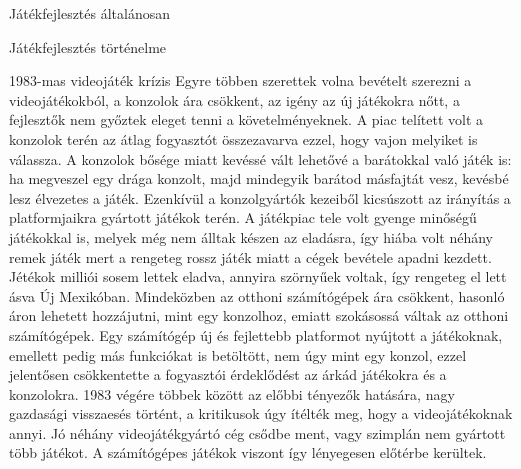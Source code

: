 \begin{MyChapter}{Játékfejlesztés általánosan}
\begin{MySection}{Játékfejlesztés történelme}
		\begin{MySubSection}{1983-mas videojáték krízis}
			Egyre többen szerettek volna bevételt szerezni a videojátékokból, a konzolok ára csökkent, az igény az új játékokra nőtt, a fejlesztők nem győztek eleget tenni a követelményeknek. A piac telített volt a konzolok terén az átlag fogyasztót összezavarva ezzel, hogy vajon melyiket is válassza. A konzolok bősége miatt kevéssé vált lehetővé a barátokkal való játék is: ha megveszel egy drága konzolt, majd mindegyik barátod másfajtát vesz, kevésbé lesz élvezetes a játék. Ezenkívül a konzolgyártók kezeiből kicsúszott az irányítás a platformjaikra gyártott játékok terén. A játékpiac tele volt gyenge minőségű játékokkal is, melyek még nem álltak készen az eladásra, így hiába volt néhány remek játék mert a rengeteg rossz játék miatt a cégek bevétele apadni kezdett. Jétékok milliói sosem lettek eladva, annyira szörnyűek voltak, így rengeteg el lett ásva Új Mexikóban. Mindeközben az otthoni számítógépek ára csökkent, hasonló áron lehetett hozzájutni, mint egy konzolhoz, emiatt szokásossá váltak az otthoni számítógépek. Egy számítógép új és fejlettebb platformot nyújtott a játékoknak, emellett pedig más funkciókat is betöltött, nem úgy mint egy konzol, ezzel jelentősen csökkentette a fogyasztói érdeklődést az árkád játékokra és a konzolokra. 1983 végére többek között az előbbi tényezők hatására, nagy gazdasági visszaesés történt, a kritikusok úgy ítélték meg, hogy a videojátékoknak annyi. Jó néhány videojátékgyártó cég csődbe ment, vagy szimplán nem gyártott több játékot.
			A számítógépes játékok viszont így lényegesen előtérbe kerültek.
			\cite{video_game_crash_1983}
		
		\end{MySubSection}
	

\end{MySection}
\end{MyChapter}
